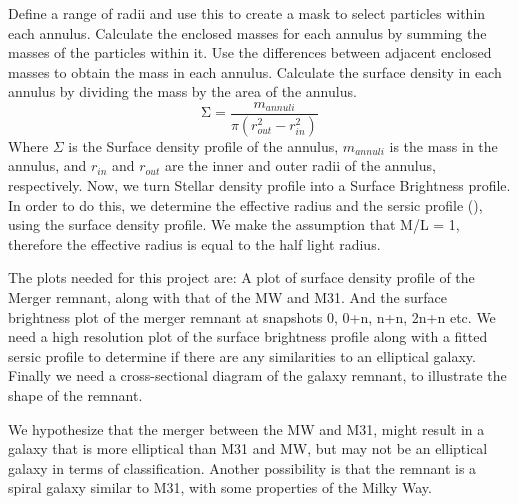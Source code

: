 \documentclass[preprint2, times]{aastex631}
\begin{document}
Define a range of radii and use this to create a mask to select particles within each annulus.
Calculate the enclosed masses for each annulus by summing the masses of the particles within it.
Use the differences between adjacent enclosed masses to obtain the mass in each annulus.
Calculate the surface density in each annulus by dividing the mass by the area of the annulus.
\begin{equation}
\mathrm{\Sigma} = \frac{m_{annuli}}{\pi(r_{out}^2-r_{in}^2)}
\end{equation}
Where $\Sigma$ is the Surface density profile of the annulus, $m_{annuli}$ is the mass in the annulus, and $r_{in}$ and $r_{out}$ are the inner and outer radii of the annulus, respectively. Now, we turn Stellar density profile into a Surface Brightness profile. In order to do this, we determine the effective radius and the sersic profile (\citet{Sersic_1963}), using the surface density profile. We make the assumption that M/L = 1, therefore the effective radius is equal to the half light radius.
\par
The plots needed for this project are: A plot of surface density profile of the Merger remnant, along with that of the MW and M31. And the surface brightness plot of the merger remnant at snapshots 0, 0+n, n+n, 2n+n etc. We need a high resolution plot of the surface brightness profile along with a fitted sersic profile to determine if there are any similarities to an elliptical galaxy. Finally we need a cross-sectional diagram of the galaxy remnant, to illustrate the shape of the remnant.
\par
We hypothesize that the merger between the MW and M31, might result in a galaxy that is more elliptical than M31 and MW, but may not be an elliptical galaxy in terms of classification. Another possibility is that the remnant is a spiral galaxy similar to M31, with some properties of the Milky Way.
\end{document}
